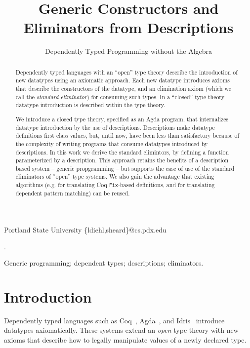 \documentclass[preprint,nonatbib]{sigplanconf}
\begin{document}
\setlength{\pdfpageheight}{\paperheight}
\setlength{\pdfpagewidth}{\paperwidth}


\title{Generic Constructors and Eliminators from Descriptions}
\subtitle{Dependently Typed Programming without the Algebra}

           {Portland State University}
           {\{ldiehl,sheard\}@cs.pdx.edu}

\maketitle

\begin{abstract}
Dependently typed languages with an ``open'' type theory describe
the introduction of new datatypes using an axiomatic approach.
Each new datatype introduces axioms that describe the constructors
of the datatype, and an elimination axiom (which we call
the {\it standard eliminator}) for consuming such types. In a ``closed''
type theory datatype introduction is described within the type theory.

We introduce a closed type theory, specified as an Agda program,
that internalizes datatype introduction by the use of descriptions.
Descriptions make datatype definitions first class values, but, until now,
have been less than satisfactory because of the complexity of writing
programs that consume datatypes introduced by descriptions. In this
work we derive the standard elimintors, by defining a function
parameterized by a description. This approach retains the benefits of
a description based system -- generic propgramming -- but supports
the ease of use of the standard eliminators of ``open'' type systems.
We also gain the advantage that existing algorithms
(e.g. \citet{gimenez1995codifying} for translating
{\sc Coq} {\tt Fix}-based definitions, and
\citet{Goguen06eliminatingdependent} for
translating dependent pattern matching) can be reused.

\end{abstract}

.

\keywords
Generic programming; dependent types; descriptions; eliminators.

\section{Introduction}
\label{sec:intro}
Dependently typed languages such as
{\sc Coq}~\citep{coq08},
{\sc Agda}~\citep{norell2007towards}, and 
{\sc Idris}~\citep{brady2011idris} 
introduce datatypes axiomatically.
These systems extend an {\it open} type theory with new axioms that
describe how to legally manipulate values of a newly declared type.
\end{document}
